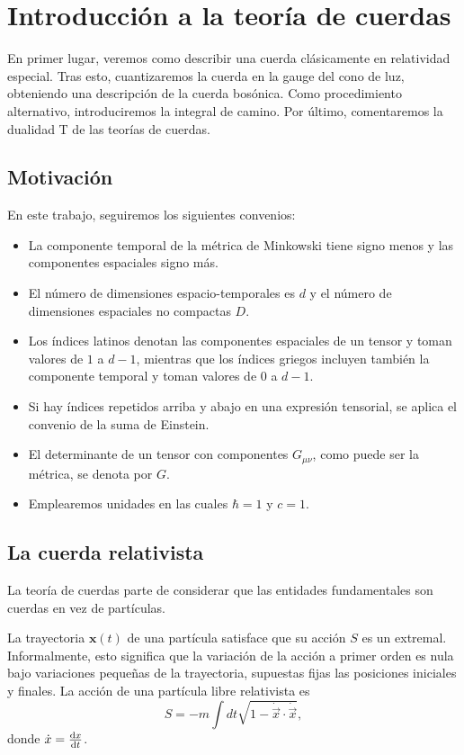 \chapter{Introducción a la teoría de cuerdas}

En primer lugar, veremos como describir una cuerda clásicamente en relatividad especial.
Tras esto, cuantizaremos la cuerda en la gauge del cono de luz, obteniendo una descripción de la cuerda bosónica.
Como procedimiento alternativo, introduciremos la integral de camino.
Por último, comentaremos la dualidad T de las teorías de cuerdas.

\section{Motivación}



En este trabajo, seguiremos los siguientes convenios:
\begin{itemize}
  \item La  componente temporal de la métrica de Minkowski tiene signo menos y las componentes espaciales signo más.
  \item El número de dimensiones espacio-temporales es $d$ y el número de dimensiones espaciales no compactas $D$.
  \item Los índices latinos denotan las componentes espaciales de un tensor y toman valores de $1$ a $d-1$, mientras que los índices griegos
  incluyen también la componente temporal y toman valores de $0$ a $d-1$. 
  \item Si hay índices repetidos arriba y abajo en una expresión tensorial, se aplica el convenio de la suma de Einstein.
  \item El determinante de un tensor con componentes $G_{\mu\nu}$, como puede ser la métrica, se denota por $G$.
  \item Emplearemos unidades en las cuales $\hbar = 1$ y $c=1$.
\end{itemize}

\section{La cuerda relativista}

La teoría de cuerdas parte de considerar que las entidades fundamentales son cuerdas
en vez de partículas. 

La trayectoria $\mathbf x(t)$ de una partícula satisface que su acción $S$ es un extremal.
Informalmente, esto significa que la variación de la acción a primer orden es nula bajo
variaciones pequeñas de la trayectoria, supuestas fijas las posiciones iniciales y finales.
La acción de una partícula libre relativista es
\begin{equation}
  S=-m\int dt \sqrt{1-\dot {\vec{x}} \cdot \dot {\vec{x}}},
\end{equation}
donde $\dot x = \dv{x}{t}$.


